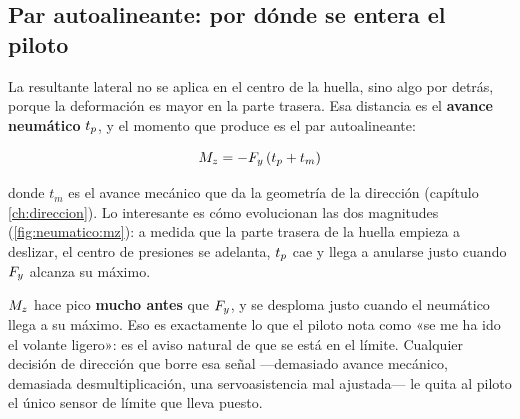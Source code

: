 \subsection{Par autoalineante: por dónde se entera el piloto}

La resultante lateral no se aplica en el centro de la huella, sino algo por
detrás, porque la deformación es mayor en la parte trasera. Esa distancia es el
\textbf{avance neumático} $t_p$, y el momento que produce es el par
autoalineante:

\begin{equation}
  M_z = -F_y\,(t_p + t_m)
  \label{eq:mz}
\end{equation}

donde $t_m$ es el avance mecánico que da la geometría de la dirección
(capítulo \ref{ch:direccion}). Lo interesante es cómo evolucionan las dos
magnitudes (\cref{fig:neumatico:mz}): a medida que la parte trasera de la huella
empieza a deslizar, el centro de presiones se adelanta, $t_p$ cae y llega a
anularse justo cuando $F_y$ alcanza su máximo.

\begin{clave}
$M_z$ hace pico \textbf{mucho antes} que $F_y$, y se desploma justo cuando el
neumático llega a su máximo. Eso es exactamente lo que el piloto nota como
«se me ha ido el volante ligero»: es el aviso natural de que se está en el
límite. Cualquier decisión de dirección que borre esa señal ---demasiado avance
mecánico, demasiada desmultiplicación, una servoasistencia mal ajustada--- le
quita al piloto el único sensor de límite que lleva puesto.
\end{clave}

